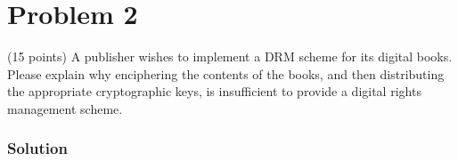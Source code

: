 \section*{Problem 2}
(15 points) A publisher wishes to implement a DRM scheme for its digital books. Please explain why enciphering the contents of the books, and then distributing the appropriate cryptographic keys, is insufficient to provide a digital rights management scheme.

\subsubsection*{Solution}
